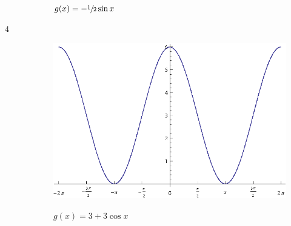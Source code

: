 \documentclass{exam}
\begin{document}
\begin{description}
\begin{figure}[H]
        $g(x) = - \sfrac{1}{2} \sin x$
      \end{figure}

    \item[4]
      \begin{figure}[H]
        \centering
        \includegraphics[scale=0.9]{example04.eps}

        $g(x) = 3 + 3 \cos x$
      \end{figure}
  \end{description}
\end{document}
